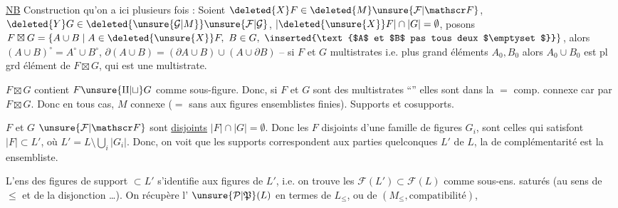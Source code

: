 \uline{NB} Construction qu'on a  ici plusieurs fois : Soient $\deleted{X}F\in\deleted{M}\unsure{\mathcal F|\mathscr F}$, $\deleted{Y}G\in\deleted{\unsure{\mathcal G|M}}\unsure{\mathcal F|\mathcal G}$, $\lvert\deleted{\unsure{X}}F\rvert\cap\lvert G\rvert=\emptyset$, posons $F\boxtimes G=\{A\cup B\mid A\in\deleted{\unsure{X}}F,\ B\in G,\ \inserted{\text{$A$ et $B$ pas tous deux $\emptyset$}}\}$, alors $(A\cup B)^{\circ}=A^{\circ}\cup B^{\circ}$, $\partial(A\cup B)=(\partial A\cup B)\cup(A\cup\partial B)$ -- si $F$ et $G$   multistrates i.e.   plus grand éléments  $A_0,B_0$ alors $A_0\cup B_0$ est pl grd élément de $F\boxtimes G$, qui est une multistrate.

 $F\boxtimes G$ contient $F\unsure{\amalg|\sqcup}G$ comme sous-figure. Donc, si $F$ et $G$ sont des multistrates ``'' elles sont dans la $=$ comp. connexe car  par $F\boxtimes G$. Donc en tous cas, \margin{\unsure{,|)}} $M$ connexe ($=$ sans   aux  figures ensemblistes finies).
Supports et cosupports.

$F$ et $G$  $\unsure{\mathcal F|\mathscr F}$ sont \uline{disjoints}   $\lvert F\rvert\cap\lvert G\rvert=\emptyset$. Donc les $F$ disjoints d'une famille de figures $G_i$, sont celles qui  satisfont $\lvert F\rvert\subset L'$, où $L'=L\setminus\bigcup_i\lvert G_i\rvert$. Donc, on voit que les supports correspondent aux parties quelconques $L'$ de $L$, la  de complémentarité est la  ensembliste.

 L'ens des figures  de support $\subset L'$  s'identifie aux figures de $L'$, i.e. on trouve les $\mathcal F(L')\subset\mathcal F(L)$ comme sous-ens. saturés (au sens de $\leq$ et de la disjonction \ldots).
On récupère l' $\unsure{\mathcal P|\mathfrak P}(L)$ en termes de $L_{\leq}$, ou de $(M_{\leq},\text{compatibilité})$,


